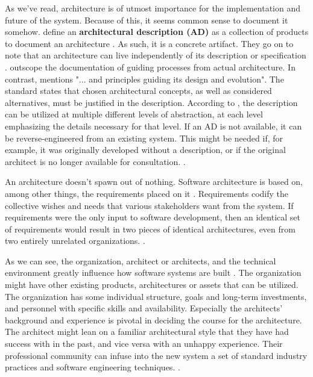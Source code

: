 \documentclass[utf8,english]{gradu3}
\begin{document}
As we've read, architecture is of utmost importance for the implementation and
future of the system. Because of this, it seems common sense to document
it somehow. \textcite[24]{Bass1998} define an \textbf{architectural description (AD)} as a
collection of products to document an architecture \parencite[3]{IEEE42010}. As such, it
is a concrete artifact. They go on to note that an architecture can live
independently of its description or specification \parencite[24]{Bass1998}. \textcite[27]{Bass1998}
outscope the documentation of guiding processes from actual architecture.  In
contrast, \textcite[3]{IEEE42010} mentions "... and principles guiding its design and
evolution". The standard states that chosen architectural concepts, as well as
considered alternatives, must be justified in the description. According to
\textcite[67]{IEEE12207}, the description can be utilized at multiple different levels of
abstraction, at each level emphasizing the details necessary for that level. If
an AD is not available, it can be reverse-engineered from an existing system.
This might be needed if, for example, it was originally developed without a
description, or if the original architect is no longer available for
consultation. \parencite[7]{IEEE42010}.

An architecture doesn't spawn out of nothing. Software architecture is based on,
among other things, the requirements placed on it \parencite{Bass1998}. Requirements
codify the collective wishes and needs that various stakeholders want from the
system. If requirements were the only input to software development, then an
identical set of requirements would result in two pieces of identical
architectures, even from two entirely unrelated organizations. \parencite[5-9]{Bass1998}.

As we can see, the organization, architect or architects, and the technical
environment greatly influence how software systems are built \parencite{Bass1998}. The
organization might have other existing products, architectures or assets that
can be utilized. The organization has some individual structure, goals and
long-term investments, and personnel with specific skills and availability.
Especially the architects' background and experience is pivotal in deciding the
course for the architecture. The architect might lean on a familiar
architectural style that they have had success with in the past, and vice versa
with an unhappy experience. Their professional community can infuse into the new
system a set of standard industry practices and software engineering techniques.
\parencite[5-9]{Bass1998}.
\end{document}
